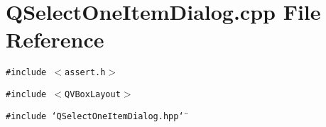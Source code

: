 \section{QSelect\-One\-Item\-Dialog.cpp File Reference}
\label{QSelectOneItemDialog_8cpp}
{\tt \#include $<$assert.h$>$}\par
{\tt \#include $<$QVBox\-Layout$>$}\par
{\tt \#include \char`\"{}QSelect\-One\-Item\-Dialog.hpp\char`\"{}}\par
